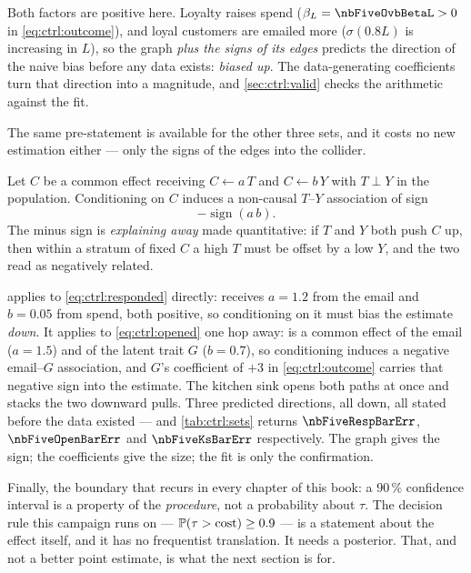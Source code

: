 Both factors are positive here. Loyalty raises spend ($\beta_L = \nbFiveOvbBetaL > 0$ in
\cref{eq:ctrl:outcome}), and loyal customers are emailed more
($\sigma(0.8L)$ is increasing in $L$), so the graph \emph{plus the signs of its edges} predicts
the direction of the naive bias before any data exists: \emph{biased up}. The
data-generating coefficients turn that direction into a magnitude, and \cref{sec:ctrl:valid}
checks the arithmetic against the fit.

The same pre-statement is available for the other three sets, and it costs no new estimation
either --- only the signs of the edges into the collider.

\begin{proposition}\label{prop:ctrl:collider}
Let $C$ be a common effect receiving $C \leftarrow a\,T$ and $C \leftarrow b\,Y$ with $T \perp Y$
in the population. Conditioning on $C$ induces a non-causal $T$--$Y$ association of sign
%
\begin{equation}
  -\operatorname{sign}(a\,b).
  \label{eq:ctrl:collidersign}
\end{equation}
%
The minus sign is \emph{explaining away} made quantitative: if $T$ and $Y$ both push $C$ up, then
within a stratum of fixed $C$ a high $T$ must be offset by a low $Y$, and the two read as
negatively related.
\end{proposition}

 applies to \cref{eq:ctrl:responded} directly:  receives
$a = 1.2$ from the email and $b = 0.05$ from spend, both positive, so conditioning on it must bias
the estimate \emph{down}. It applies to \cref{eq:ctrl:opened} one hop away:  is
a common effect of the email ($a = 1.5$) and of the latent trait $G$ ($b = 0.7$), so conditioning
induces a negative email--$G$ association, and $G$'s coefficient of $+3$ in \cref{eq:ctrl:outcome}
carries that negative sign into the estimate. The kitchen sink opens both paths at once and stacks
the two downward pulls. Three predicted directions, all down, all stated before the data
existed --- and \cref{tab:ctrl:sets} returns $\nbFiveRespBarErr$, $\nbFiveOpenBarErr$ and
$\nbFiveKsBarErr$ respectively. The graph gives the sign; the coefficients give the size; the fit
is only the confirmation.

Finally, the boundary that recurs in every chapter of this book: a 90\,\% confidence interval is
a property of the \emph{procedure}, not a probability about $\tau$. The decision rule this
campaign runs on --- $\operatorname{\mathbb{P}}(\tau > \text{cost}) \ge 0.9$ --- is a statement about the effect
itself, and it has no frequentist translation. It needs a posterior. That, and not a better point
estimate, is what the next section is for.

